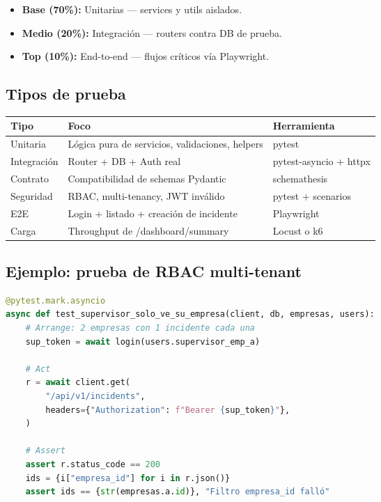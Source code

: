 \documentclass[12pt,a4paper,oneside]{article}
\begin{document}
\begin{itemize}[leftmargin=*]
  \item \textbf{Base (70\%):} Unitarias — services y utils aislados.
  \item \textbf{Medio (20\%):} Integración — routers contra DB de prueba.
  \item \textbf{Top (10\%):} End-to-end — flujos críticos vía Playwright.
\end{itemize}

\subsection{Tipos de prueba}

\begin{table}[h]
\centering
\small
\begin{tabularx}{\textwidth}{lXl}
\toprule
\textbf{Tipo} & \textbf{Foco} & \textbf{Herramienta} \\
\midrule
Unitaria & Lógica pura de servicios, validaciones, helpers & pytest \\
Integración & Router + DB + Auth real & pytest-asyncio + httpx \\
Contrato & Compatibilidad de schemas Pydantic & schemathesis \\
Seguridad & RBAC, multi-tenancy, JWT inválido & pytest + scenarios \\
E2E & Login + listado + creación de incidente & Playwright \\
Carga & Throughput de /dashboard/summary & Locust o k6 \\
\bottomrule
\end{tabularx}
\end{table}

\subsection{Ejemplo: prueba de RBAC multi-tenant}

\begin{lstlisting}[language=Python]
@pytest.mark.asyncio
async def test_supervisor_solo_ve_su_empresa(client, db, empresas, users):
    # Arrange: 2 empresas con 1 incidente cada una
    sup_token = await login(users.supervisor_emp_a)

    # Act
    r = await client.get(
        "/api/v1/incidents",
        headers={"Authorization": f"Bearer {sup_token}"},
    )

    # Assert
    assert r.status_code == 200
    ids = {i["empresa_id"] for i in r.json()}
    assert ids == {str(empresas.a.id)}, "Filtro empresa_id falló"
\end{lstlisting}
\end{document}
